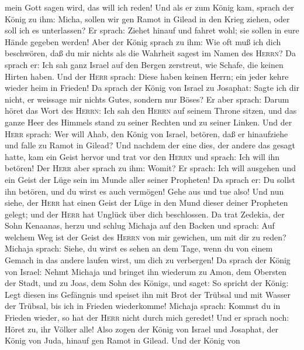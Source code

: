 mein Gott sagen wird, das will ich reden!  Und als er zum
König kam, sprach der König zu ihm: Micha, sollen wir gen Ramot in
Gilead in den Krieg ziehen, oder soll ich es unterlassen? Er sprach:
Ziehet hinauf und fahret wohl; sie sollen in eure Hände gegeben werden!
 Aber der König sprach zu ihm: Wie oft muß ich dich
beschwören, daß du mir nichts als die Wahrheit sagest im Namen des
\textsc{Herrn}?  Da sprach er: Ich sah ganz Israel auf
den Bergen zerstreut, wie Schafe, die keinen Hirten haben. Und der
\textsc{Herr} sprach: Diese haben keinen Herrn; ein jeder kehre wieder
heim in Frieden!  Da sprach der König von Israel zu
Josaphat: Sagte ich dir nicht, er weissage mir nichts Gutes, sondern nur
Böses?  Er aber sprach: Darum höret das Wort des
\textsc{Herrn}: Ich sah den \textsc{Herrn} auf seinem Throne sitzen, und
das ganze Heer des Himmels stand zu seiner Rechten und zu seiner Linken.
 Und der \textsc{Herr} sprach: Wer will Ahab, den König
von Israel, betören, daß er hinaufziehe und falle zu Ramot in Gilead?
 Und nachdem der eine dies, der andere das gesagt hatte,
kam ein Geist hervor und trat vor den \textsc{Herrn} und sprach: Ich
will ihn betören! Der \textsc{Herr} aber sprach zu ihm: Womit?
 Er sprach: Ich will ausgehen und ein Geist der Lüge sein
im Munde aller seiner Propheten! Da sprach er: Du sollst ihn betören,
und du wirst es auch vermögen! Gehe aus und tue also! 
Und nun siehe, der \textsc{Herr} hat einen Geist der Lüge in den Mund
dieser deiner Propheten gelegt; und der \textsc{Herr} hat Unglück über
dich beschlossen.  Da trat Zedekia, der Sohn Kenaanas,
herzu und schlug Michaja auf den Backen und sprach: Auf welchem Weg ist
der Geist des \textsc{Herrn} von mir gewichen, um mit dir zu reden?
 Michaja sprach: Siehe, du wirst es sehen an dem Tage,
wenn du von einem Gemach in das andere laufen wirst, um dich zu
verbergen!  Da sprach der König von Israel: Nehmt Michaja
und bringet ihn wiederum zu Amon, dem Obersten der Stadt, und zu Joas,
dem Sohn des Königs,  und saget: So spricht der König:
Legt diesen ins Gefängnis und speiset ihn mit Brot der Trübsal und mit
Wasser der Trübsal, bis ich in Frieden wiederkomme! 
Michaja sprach: Kommst du in Frieden wieder, so hat der \textsc{Herr}
nicht durch mich geredet! Und er sprach noch: Höret zu, ihr Völker alle!
 Also zogen der König von Israel und Josaphat, der König
von Juda, hinauf gen Ramot in Gilead.  Und der König von
